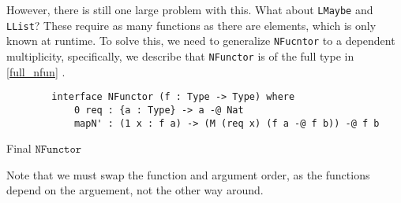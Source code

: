 However, there is still one large problem with this. 
What about \verb|LMaybe| and \verb|LList|?
These require as many functions as there are elements, which is only known at runtime.
To solve this, we need to generalize \verb|NFucntor| to a dependent multiplicity, specifically, we describe that \verb|NFunctor| is of the full type in \ref{full_nfun} \cite{dep_mult_dep_lin}.

\begin{listing}
	\label{full_nfun}
	\begin{verbatim}
		interface NFunctor (f : Type -> Type) where 
			0 req : {a : Type} -> a -@ Nat
			mapN' : (1 x : f a) -> (M (req x) (f a -@ f b)) -@ f b
	\end{verbatim}
	\caption{Final $\texttt{NFunctor}$}
\end{listing}

Note that we must swap the function and argument order, as the functions depend on the arguement, not the other way around.